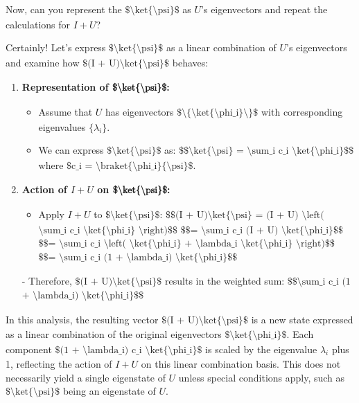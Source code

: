 \begin{ai}
Now, can you represent the $\ket{\psi}$ as $U$'s eigenvectors and repeat the calculations for $I+U$?
\end{ai}

\begin{airesult}
Certainly! Let's express \(\ket{\psi}\) as a linear combination of \(U\)'s eigenvectors and examine
how \((I + U)\ket{\psi}\) behaves:

\begin{enumerate}

\item \textbf{Representation of \(\ket{\psi}\):}
  \begin{itemize}
  \item Assume that \(U\) has eigenvectors \(\{\ket{\phi_i}\}\) with corresponding eigenvalues
\(\{\lambda_i\}\).
  \item We can express \(\ket{\psi}\) as:
    \[
    \ket{\psi} = \sum_i c_i \ket{\phi_i}
    \]
    where \(c_i = \braket{\phi_i}{\psi}\).
  \end{itemize}

\item \textbf{Action of \(I + U\) on \(\ket{\psi}\):}
  \begin{itemize}
  \item Apply \(I + U\) to \(\ket{\psi}\):
    \[
    (I + U)\ket{\psi} = (I + U) \left( \sum_i c_i \ket{\phi_i} \right)
    \]
    \[
    = \sum_i c_i (I + U) \ket{\phi_i}
    \]
    \[
    = \sum_i c_i \left( \ket{\phi_i} + \lambda_i \ket{\phi_i} \right)
    \]
    \[
    = \sum_i c_i (1 + \lambda_i) \ket{\phi_i}
    \]
  \end{itemize}
  - Therefore, \((I + U)\ket{\psi}\) results in the weighted sum:
    \[
    \sum_i c_i (1 + \lambda_i) \ket{\phi_i}
    \]

\end{enumerate}

In this analysis, the resulting vector \((I + U)\ket{\psi}\) is a new state expressed as a linear
combination of the original eigenvectors \(\ket{\phi_i}\). Each component \((1 + \lambda_i) c_i
\ket{\phi_i}\) is scaled by the eigenvalue \(\lambda_i\) plus 1, reflecting the action of \(I + U\)
on this linear combination basis. This does not necessarily yield a single eigenstate of \(U\)
unless special conditions apply, such as \(\ket{\psi}\) being an eigenstate of \(U\).
\end{airesult}


